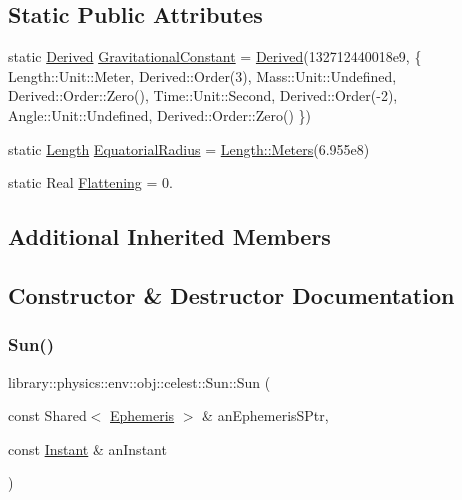 \subsection*{Static Public Attributes}
\begin{DoxyCompactItemize}
\item 
static \hyperlink{classlibrary_1_1physics_1_1units_1_1_derived}{Derived} \hyperlink{classlibrary_1_1physics_1_1env_1_1obj_1_1celest_1_1_sun_a83c05d07f32867a958d06d8c1141793d}{Gravitational\+Constant} = \hyperlink{classlibrary_1_1physics_1_1units_1_1_derived}{Derived}(132712440018e9, \{ Length\+::\+Unit\+::\+Meter, Derived\+::\+Order(3), Mass\+::\+Unit\+::\+Undefined, Derived\+::\+Order\+::\+Zero(), Time\+::\+Unit\+::\+Second, Derived\+::\+Order(-\/2), Angle\+::\+Unit\+::\+Undefined, Derived\+::\+Order\+::\+Zero() \})
\item 
static \hyperlink{classlibrary_1_1physics_1_1units_1_1_length}{Length} \hyperlink{classlibrary_1_1physics_1_1env_1_1obj_1_1celest_1_1_sun_a48679ac65c067b77adf005ce9ca5cfca}{Equatorial\+Radius} = \hyperlink{classlibrary_1_1physics_1_1units_1_1_length_ad523a3737d5c3f23a64588eac83f2148}{Length\+::\+Meters}(6.\+955e8)
\item 
static Real \hyperlink{classlibrary_1_1physics_1_1env_1_1obj_1_1celest_1_1_sun_a48caf436831d176c692b6aa714b77676}{Flattening} = 0.
\end{DoxyCompactItemize}
\subsection*{Additional Inherited Members}


\subsection{Constructor \& Destructor Documentation}
\mbox{\label{classlibrary_1_1physics_1_1env_1_1obj_1_1celest_1_1_sun_af7d255396b52aa8c9fa5379ca01d08c8}} 
\subsubsection{\texorpdfstring{Sun()}{Sun()}}
{\footnotesize\ttfamily library\+::physics\+::env\+::obj\+::celest\+::\+Sun\+::\+Sun (\begin{DoxyParamCaption}\item[{const Shared$<$ \hyperlink{classlibrary_1_1physics_1_1env_1_1_ephemeris}{Ephemeris} $>$ \&}]{an\+Ephemeris\+S\+Ptr,  }\item[{const \hyperlink{classlibrary_1_1physics_1_1time_1_1_instant}{Instant} \&}]{an\+Instant }\end{DoxyParamCaption})}

